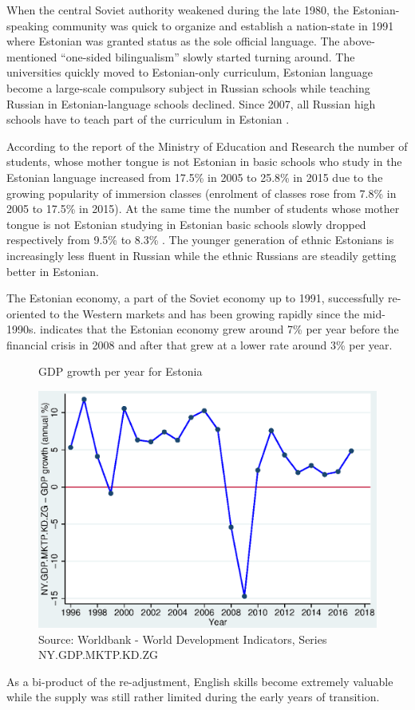 \documentclass[12pt, a4paper]{article}
\begin{document}
When the central Soviet authority weakened during the late 1980, the
Estonian-speaking community was quick to organize and establish a
nation-state in 1991 where
Estonian was granted status as the sole official language.  The
above-mentioned ``one-sided bilingualism'' slowly started turning
around.  The universities quickly moved to Estonian-only curriculum,
Estonian language become a large-scale compulsory subject in Russian
schools while teaching Russian in Estonian-language schools declined.
Since 2007, all Russian high schools have to teach part of the
curriculum in Estonian \citep{lindemann+saar2011Russian2ndGeneration}.

According to the report of the Ministry of Education and Research the number
of students, whose mother tongue is not Estonian in basic schools who study in the Estonian language increased from 17.5\% in 2005 to 25.8\% in 2015 due to the growing popularity of immersion
classes (enrolment of classes rose from 7.8\% in 2005 to 17.5\% in 2015).
At the same time the number of students whose mother tongue is not
Estonian studying in Estonian basic schools slowly dropped
respectively from 9.5\% to  8.3\% \citep{HTM2015}.  The younger generation of ethnic Estonians is
increasingly less fluent in Russian while the ethnic Russians are
steadily getting better in Estonian.

The Estonian economy, a part of the Soviet economy up to 1991, successfully
re-oriented to the Western markets and has been growing rapidly since
the mid-1990s.   indicates that the Estonian economy grew around 7\% per year before the financial crisis in 2008 and after that grew at a lower rate around 3\% per year.
\begin{figure}[h]
	\centering
	\caption{GDP growth per year for Estonia}\label{fig:gdp_growth}
	\includegraphics[width=0.6\linewidth]{gdp_growth_per_year.eps}
	\caption*{Source: Worldbank - World Development Indicators, Series  NY.GDP.MKTP.KD.ZG}
\end{figure}
  As
a bi-product of the re-adjustment, English skills become extremely
valuable while the supply was still rather limited during the early
years of transition.
\end{document}
